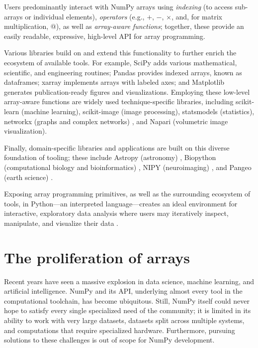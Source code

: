 Users predominantly interact with NumPy arrays using {\em indexing} (to access
sub-arrays or individual elements), {\em operators} (e.g., $+$, $-$, $\times$,
and, for matrix multiplication, $@$), as well as {\em array-aware functions};
together, these provide an easily readable, expressive, high-level API for
array programming.

Various libraries build on and extend this functionality to further enrich the
ecosystem of available tools.  For example, SciPy adds various mathematical,
scientific, and engineering routines; Pandas provides indexed arrays, known as
dataframes; xarray implements arrays with labeled axes; and Matplotlib
generates publication-ready figures and visualizations.  Employing these
low-level array-aware functions are widely used technique-specific libraries,
including scikit-learn (machine learning), scikit-image (image processing),
statsmodels (statistics),  networkx (graphs and complex networks)
\cite{SciPyProceedings_11}, and Napari (volumetric image visualization).

Finally, domain-specific libraries and applications are built on this diverse
foundation of tooling; these include Astropy (astronomy) \cite{astropy:2013,
astropy:2018}, Biopython (computational biology and bioinformatics) \cite{cock2009biopython},
NIPY (neuroimaging) \cite{millman2007analysis}, and Pangeo (earth science) \cite{2018EGUGA..2012146H}.

Exposing array programming primitives, as well as the surrounding ecosystem of
tools, in Python---an interpreted language---creates an ideal environment for
interactive, exploratory data analysis where users may iteratively inspect,
manipulate, and visualize their data \cite{perez2007ipython}.

\section*{The proliferation of arrays}


Recent years have seen a massive explosion in data science, machine learning,
and artificial intelligence.  NumPy and its API, underlying almost every tool
in the computational toolchain, has become ubiquitous.  Still, NumPy itself
could never hope to satisfy every single specialized need of the community; it
is limited in its ability to work with very large datasets, datasets split
across multiple systems, and computations that require specialized hardware.
Furthermore, pursuing solutions to these challenges is out of scope for NumPy
development.

